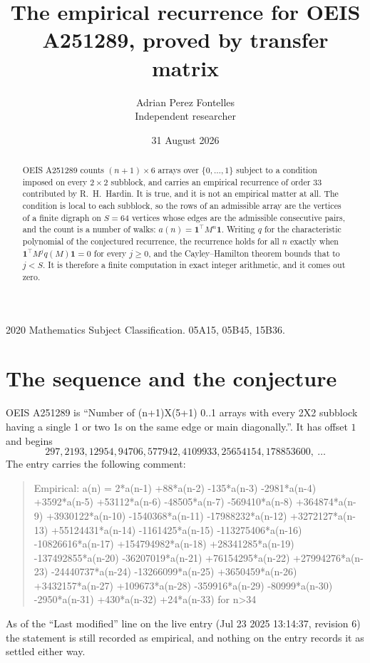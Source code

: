 \documentclass[11pt,a4paper]{article}
\title{The empirical recurrence for OEIS A251289, proved by transfer matrix}
\author{Adrian Perez Fontelles\\ \small Independent researcher}
\date{31 August 2026}
\theoremstyle{plain}
\theoremstyle{definition}
\begin{document}
\maketitle

\begin{abstract}
OEIS A251289 counts $(n+1)\times6$ arrays over $\{0,\dots,1\}$ subject to a condition imposed on
every $2\times2$ subblock, and carries an empirical recurrence of order $33$ contributed
by R.~H.~Hardin. It is true, and it is not an empirical matter at all. The condition is local
to each subblock, so the rows of an admissible array are the vertices of a finite digraph
on $S=64$ vertices whose edges are the admissible consecutive pairs, and the count is a
number of walks: $a(n)=\mathbf{1}^{\!\top}M^{n}\mathbf{1}$. Writing $q$
for the characteristic polynomial of the conjectured recurrence, the recurrence holds for all
$n$ exactly when $\mathbf{1}^{\!\top}M^{j}q(M)\mathbf{1}=0$ for every $j\ge0$, and the
Cayley--Hamilton theorem bounds that to $j<S$. It is therefore a finite computation in exact
integer arithmetic, and it comes out zero.
\end{abstract}

\noindent\small 2020 Mathematics Subject Classification. 05A15, 05B45, 15B36.\normalsize

\section{The sequence and the conjecture}

OEIS A251289 is ``Number of (n+1)X(5+1) 0..1 arrays with every 2X2 subblock having a single 1 or two 1s on the same edge or main diagonally.''. It has offset $1$ and begins
\[
297, 2193, 12954, 94706, 577942, 4109933, 25654154, 178853600,\ \dots
\]
The entry carries the following comment:
\begin{quote}\small
Empirical: a(n) = 2*a(n-1) +88*a(n-2) -135*a(n-3) -2981*a(n-4) +3592*a(n-5) +53112*a(n-6) -48505*a(n-7) -569410*a(n-8) +364874*a(n-9) +3930122*a(n-10) -1540368*a(n-11) -17988232*a(n-12) +3272127*a(n-13) +55124431*a(n-14) -1161425*a(n-15) -113275406*a(n-16) -10826616*a(n-17) +154794982*a(n-18) +28341285*a(n-19) -137492855*a(n-20) -36207019*a(n-21) +76154295*a(n-22) +27994276*a(n-23) -24440737*a(n-24) -13266099*a(n-25) +3650459*a(n-26) +3432157*a(n-27) +109673*a(n-28) -359916*a(n-29) -80999*a(n-30) -2950*a(n-31) +430*a(n-32) +24*a(n-33) for n>34
\end{quote}
As of the ``Last modified'' line on the live entry (Jul 23 2025 13:14:37, revision 6) the statement is
still recorded as empirical, and nothing on the entry records it as settled either way.
\end{document}
